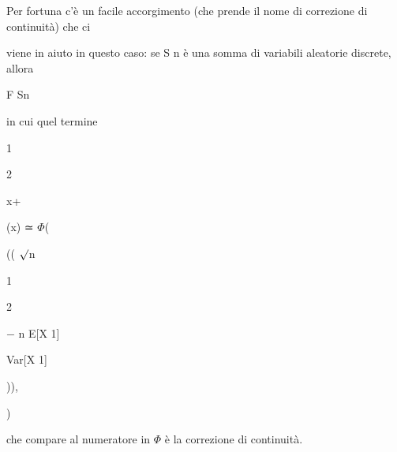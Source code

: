\documentclass[a4paper,portrait,12pt]{article}
\begin{document}
\begin{flushleft}
Per fortuna c'\`{e} un facile accorgimento (che prende il nome di correzione di continuit\`{a}) che ci
\end{flushleft}


\begin{flushleft}
viene in aiuto in questo caso: se S n \`{e} una somma di variabili aleatorie discrete, allora
\end{flushleft}


\begin{flushleft}
F Sn
\end{flushleft}


\begin{flushleft}
in cui quel termine
\end{flushleft}





1


2





\begin{flushleft}
x+
\end{flushleft}


\begin{flushleft}
(x) ≃ $\Phi$(
\end{flushleft}


\begin{flushleft}
(( $\surd$n
\end{flushleft}





1


2





\begin{flushleft}
$-$ n E[X 1]
\end{flushleft}


\begin{flushleft}
Var[X 1]
\end{flushleft}





)),


)





\begin{flushleft}
che compare al numeratore in $\Phi$ \`{e} la correzione di continuit\`{a}.
\end{flushleft}
\end{document}
